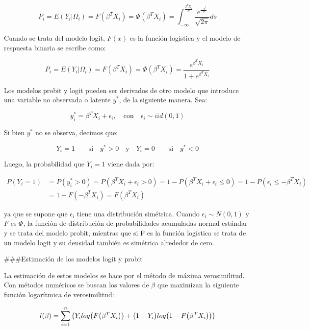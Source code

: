 \documentclass[
  12pt,
]{krantz}
\theoremstyle{definition}
\theoremstyle{definition}
\theoremstyle{definition}
\theoremstyle{remark}
\begin{document}
\[P_i=E(Y_i|\Omega_i)=F(\beta^TX_i)=\Phi(\beta^TX_i)=\int_{-\infty}^{\frac{\beta^TX_i}{\sigma}}\frac{e^{\frac{-s^2}{2}}}{\sqrt{2\pi}}ds
\label{eq:ecuacion8}\]

Cuando se trata del modelo logit, \(F(x)\) es la función logística y el modelo de respuesta binaria se escribe como:

\[P_i=E(Y_i|\Omega_i)=F(\beta^TX_i)=\Phi(\beta^TX_i)=\frac{e^{\beta^TX_i}}{1+e^{\beta^TX_i}}
\label{eq:ecuacion9}\]

Los modelos probit y logit pueden ser derivados de otro modelo que introduce una variable no observada o latente \(y^*\), de la siguiente manera. Sea:

\[y^*_i=\beta^TX_i+\epsilon_i, \quad \textrm{con} \quad \epsilon_i\sim iid(0,1)
\label{eq:ecuacion10}\]

Si bien \(y^*\) no se observa, decimos que:

\[Y_i=1\quad\quad\textrm{si} \quad y^*>0 \quad \textrm{y} \quad Y_i=0\quad\quad\textrm{si} \quad y^*<0
\label{eq:ecuacion11}\]

Luego, la probabilidad que \(Y_i=1\) viene dada por:

\begin{equation} \label{eq1}
\begin{split}
P(Y_i=1) & = P(y_i^*>0)=P(\beta^TX_i+\epsilon_i>0)= 1-P(\beta^TX_i+\epsilon_i\leq 0)=1-P(\epsilon_i\leq -\beta^TX_i)\\
 & = 1-F(-\beta^TX_i)=F(\beta^TX_i)
\end{split}
\end{equation}

ya que se supone que \(\epsilon_i\) tiene una distribución simétrica. Cuando \(\epsilon_i \sim N(0,1)\) y \(F\) es \(\Phi\), la función de distribución de probabilidades acumuladas normal estándar y se trata del modelo probit, mientras que si F es la función logística se trata de un modelo logit y su densidad también es simétrica alrededor de cero.

\#\#\#Estimación de los modelos logit y probit

La estimación de estos modelos se hace por el método de máxima verosimilitud. Con métodos numéricos se buscan los valores de \(\beta\) que maximizan la siguiente función logarítmica de verosimilitud:

\[l(\beta)=\sum^{n}_{i=1}\big{(}Y_ilog\big{(}F\big{(}\beta^TX_i\big{)}\big{)}+\big{(}1-Y_i\big{)}log\big{(}1-F\big{(}\beta^TX_i\big{)}\big{)}\big{)}
\label{eq:ecuacion12}\]
\end{document}
